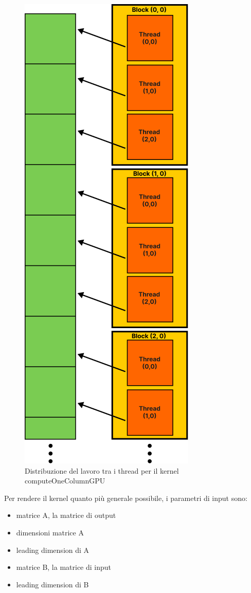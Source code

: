 \begin{figure}[h!]
    \centering
    \includegraphics[scale=0.3]{img/computeOneColumnGPU.png}
    \caption{Distribuzione del lavoro tra i thread per il kernel computeOneColumnGPU}
    \label{fig: computeOneColumnGPU-data-distribution}
\end{figure}

\noindent Per rendere il kernel quanto più generale possibile, i parametri di input sono:
\begin{itemize}
    \item matrice A, la matrice di output
    \item dimensioni matrice A
    \item leading dimension di A
    \item matrice B, la matrice di input
    \item leading dimension di B
\end{itemize}

